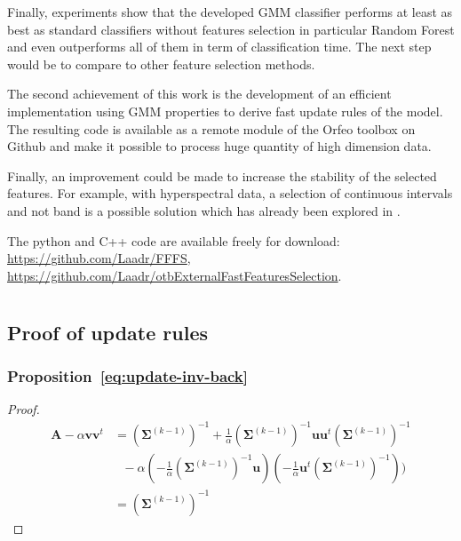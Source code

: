 \documentclass[journal,peerreview,onecolumn]{IEEEtran}
\begin{document}
Finally, experiments show that the developed GMM classifier performs at least as best as standard classifiers without features selection in particular Random Forest and even outperforms all of them in term of classification time. The next step would be to compare to other feature selection methods.

The second achievement of this work is the development of an efficient implementation using GMM properties to derive fast update rules of the model. The resulting code is available as a remote module of the Orfeo toolbox on Github and make it possible to process huge quantity of high dimension data.

Finally, an improvement could be made to increase the stability of the selected features. For example, with hyperspectral data, a selection of continuous intervals and not band is a possible solution which has already been explored in \cite{serpico2007extraction}.

The python and C++ code are available freely for download: \url{https://github.com/Laadr/FFFS}, \url{https://github.com/Laadr/otbExternalFastFeaturesSelection}.

\appendices
\section{}
\label{app:proof-update}
\subsection{Proof of update rules}
    \subsubsection{Proposition~\ref{eq:update-inv-back}}
        \begin{proof}
            \begin{align*}
                \mathbf{A} - \alpha \mathbf{v} \mathbf{v}^t
                &= (\boldsymbol{\Sigma}^{(k-1)})^{-1} + \frac{1}{\alpha} (\boldsymbol{\Sigma}^{(k-1)})^{-1} \mathbf{u} \mathbf{u}^t (\boldsymbol{\Sigma}^{(k-1)})^{-1} \\
                &~~~- \alpha (- \frac{1}{\alpha} (\boldsymbol{\Sigma}^{(k-1)})^{-1} \mathbf{u}) (- \frac{1}{\alpha} \mathbf{u}^t (\boldsymbol{\Sigma}^{(k-1)})^{-1})) \\
                &= (\boldsymbol{\Sigma}^{(k-1)})^{-1}
            \end{align*}
        \end{proof}
\end{document}
